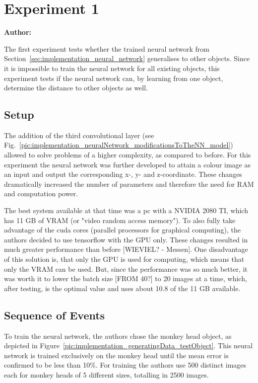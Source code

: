 \chapter{Experiment 1}
\label{cap:experiment1}

\textbf{Author: } 

The first experiment tests whether the trained neural network from Section~\ref{sec:implementation_neural_network} generalises to other objects. Since it is impossible to train the neural network for all existing objects, this experiment tests if the neural network can, by learning from one object, determine the distance to other objects as well.

\section{Setup}
The addition of the third convolutional layer (see Fig.~\ref{pic:implementation_neuralNetwork_modificationsToTheNN_model}) allowed to solve problems of a higher complexity, as compared to before. For this experiment the neural network was further developed to attain a colour image as an input and output the corresponding x-, y- and z-coordinate. These changes dramatically increased the number of parameters and therefore the need for RAM and computation power. 

The best system available at that time was a pc with a NVIDIA 2080 TI, which has 11 GB of VRAM (or "video random access memory"). To also fully take advantage of the cuda cores (parallel processors for graphical computing), the authors decided to use tensorflow with the GPU only. These changes resulted in much greater performance than before [WIEVIEL? - Messen]. One disadvantage of this solution is, that only the GPU is used for computing, which means that only the VRAM can be used. But, since the performance was so much better, it was worth it to lower the batch size [FROM 40?] to 20 images at a time, which, after testing, is the optimal value and uses about 10.8 of the 11 GB available.

\section{Sequence of Events}
To train the neural network, the authors chose the monkey head object, as depicted in Figure~\ref{pic:implementation_generatingData_testObject}. This neural network is trained exclusively on the monkey head until the mean error is confirmed to be less than 10\%. For training the authors use 500 distinct images each for monkey heads of 5 different sizes, totalling in 2500 images.


